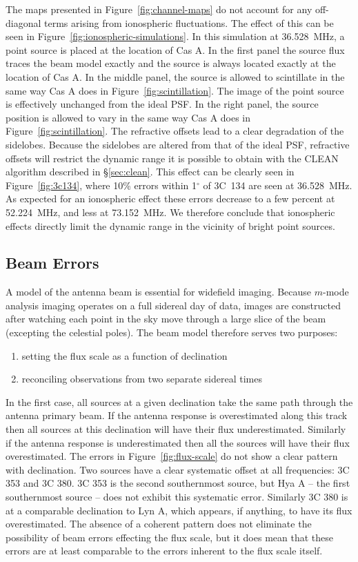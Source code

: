 \documentclass[twocolumn]{aastex61}
\begin{document}
The maps presented in Figure~\ref{fig:channel-maps} do not account for any off-diagonal terms
arising from ionospheric fluctuations. The effect of this can be seen in
Figure~\ref{fig:ionospheric-simulations}. In this simulation at 36.528~MHz, a point source is placed
at the location of Cas A. In the first panel the source flux traces the beam model exactly and the
source is always located exactly at the location of Cas A. In the middle panel, the source is
allowed to scintillate in the same way Cas A does in Figure~\ref{fig:scintillation}. The image of
the point source is effectively unchanged from the ideal PSF. In the right panel, the source
position is allowed to vary in the same way Cas A does in Figure~\ref{fig:scintillation}. The
refractive offsets lead to a clear degradation of the sidelobes. Because the sidelobes are altered
from that of the ideal PSF, refractive offsets will restrict the dynamic range it is possible to
obtain with the CLEAN algorithm described in \S\ref{sec:clean}. This effect can be clearly seen in
Figure~\ref{fig:3c134}, where 10\% errors within 1$^\circ$ of 3C~134 are seen at 36.528~MHz.  As
expected for an ionospheric effect these errors decrease to a few percent at 52.224~MHz, and less at
73.152~MHz. We therefore conclude that ionospheric effects directly limit the dynamic range in the
vicinity of bright point sources.

\subsection{Beam Errors}

A model of the antenna beam is essential for widefield imaging. Because $m$-mode analysis imaging
operates on a full sidereal day of data, images are constructed after watching each point in the sky
move through a large slice of the beam (excepting the celestial poles). The beam model therefore
serves two purposes:

\begin{enumerate}
    \item setting the flux scale as a function of declination
    \item reconciling observations from two separate sidereal times
\end{enumerate}

In the first case, all sources at a given declination take the same path through the antenna primary
beam. If the antenna response is overestimated along this track then all sources at this declination
will have their flux underestimated. Similarly if the antenna response is underestimated then all
the sources will have their flux overestimated. The errors in Figure~\ref{fig:flux-scale} do not
show a clear pattern with declination. Two sources have a clear systematic offset at all
frequencies: 3C 353 and 3C 380. 3C 353 is the second southernmost source, but Hya A -- the first
southernmost source -- does not exhibit this systematic error. Similarly 3C 380 is at a comparable
declination to Lyn A, which appears, if anything, to have its flux overestimated. The absence of a
coherent pattern does not eliminate the possibility of beam errors effecting the flux scale, but it
does mean that these errors are at least comparable to the errors inherent to the flux scale itself.
\end{document}
